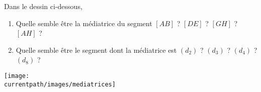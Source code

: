 \begin{exercice*}
   Dans le dessin ci-dessous,
   \begin{enumerate}
      \item Quelle semble être la médiatrice du segment $[AB]$ ? $[DE]$ ? $[GH]$ ? $[AH]$ ?
      \item Quelle semble être le segment dont la médiatrice est $(d_2)$ ? $(d_3)$ ? $(d_4)$ ? $(d_8)$ ?
   \end{enumerate}
   \begin{center}
      \texttt{[image: \\currentpath/images/mediatrices]}
   \end{center}
\end{exercice*}
        
